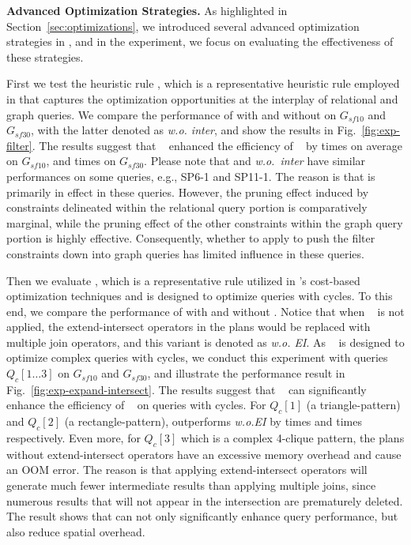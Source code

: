 \noindent\textbf{Advanced Optimization Strategies.}
As highlighted in Section~\ref{sec:optimizations}, we introduced several advanced optimization strategies in \relgo, and in the experiment, we focus on evaluating the effectiveness of these strategies.

First we test the heuristic rule \filterrule {}, which is a representative heuristic rule employed in \relgo that captures the optimization opportunities at the interplay of relational and graph queries. 
We compare the performance of \relgo with and without \filterrule on $G_{sf10}$ and $G_{sf30}$, with the latter denoted as \textit{\relgo w.o. inter}, and show the results in Fig.~\ref{fig:exp-filter}.
The results suggest that \filterrule~ enhanced the efficiency of \relgo~ by  times on average on $G_{sf10}$, and  times on $G_{sf30}$.
Please note that \relgo and \textit{\relgo w.o.~inter} have similar performances on some queries, e.g., SP6-1 and SP11-1.
The reason is that \filterrule is primarily in effect in these queries.
However, the pruning effect induced by constraints delineated within the relational query portion is comparatively marginal, while the pruning effect of the other constraints within the graph query portion is highly effective.
Consequently, whether to apply \filterrule to push the filter constraints down into graph queries has limited influence in these queries.

Then we evaluate \expandintersectrule, which is a representative rule utilized in \relgo's cost-based optimization techniques and is designed to optimize queries with cycles. 
To this end, we compare the performance of \relgo with and without \expandintersectrule.
Notice that when \expandintersectrule~ is not applied, the extend-intersect operators in the plans would be replaced with multiple join operators, and this variant is denoted as \textit{\relgo w.o. EI}.
As \expandintersectrule~ is designed to optimize complex queries with cycles, we conduct this experiment with queries $Q_c[1\ldots 3]$ on $G_{sf10}$ and $G_{sf30}$, and illustrate the performance result in Fig.~\ref{fig:exp-expand-intersect}.
The results suggest that \expandintersectrule~ can significantly enhance the efficiency of \relgo~ on queries with cycles. 
For $Q_c[1]$ (a triangle-pattern) and $Q_c[2]$ (a rectangle-pattern), \relgo outperforms \textit{\relgo w.o.EI} by  times and  times respectively.
Even more, for $Q_c[3]$ which is a complex 4-clique pattern, the plans without extend-intersect operators have an excessive memory overhead and cause an OOM error.
The reason is that applying extend-intersect operators will generate much fewer intermediate results than applying multiple joins, since numerous results that will not appear in the intersection are prematurely deleted.
The result shows that \expandintersectrule can not only significantly enhance query performance, but also reduce spatial overhead.

